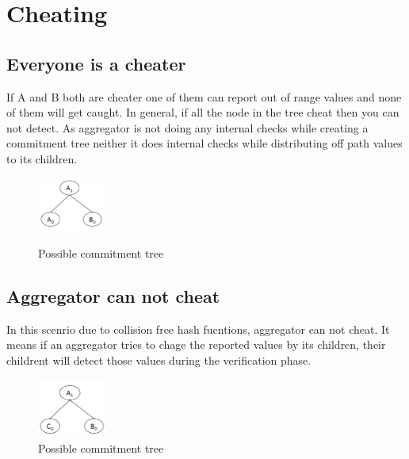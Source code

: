 \chapter{Cheating}

\section{Everyone is a cheater}
If A and B both are cheater one of them can report out of range values and none of them will get caught. In general, if all the node in the tree cheat then you can not detect.
As aggregator is not doing any internal checks  while creating a commitment tree neither it does internal checks while distributing off path values to its children.

\begin{figure}[t]
	\centering
		\includegraphics[width=0.2\textwidth]{commitment_tree_1.png}\\
		\caption{Possible commitment tree}
	\label{fig:figure2}
\end{figure}

\section{Aggregator can not cheat}

In this scenrio due to collision free hash fucntions, aggregator can not cheat. It means if an aggregator tries to chage the reported values by its children, their childrent will detect those values during the verification phase. 

\begin{figure}[t]
	\centering
		\includegraphics[width=0.2\textwidth]{commitment_tree_2.png}
		\caption{Possible commitment tree}
	\label{fig:figure2}
\end{figure}
